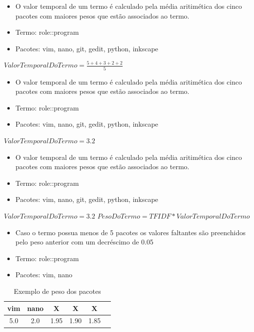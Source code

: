 \begin{frame}
    \begin{itemize}
        \item O valor temporal de um termo é calculado pela média aritimética dos cinco
pacotes com maiores pesos que estão associados
ao termo.
        \item Termo: role::program
        \item Pacotes: vim, nano, git, gedit, python, inkscape
    \end{itemize}

    $ValorTemporalDoTermo = \frac{5 + 4 + 3 + 2 + 2}{5}$
\end{frame}

\begin{frame}
    \begin{itemize}
        \item O valor temporal de um termo é calculado pela média aritimética dos cinco
pacotes com maiores pesos que estão associados
ao termo.
        \item Termo: role::program
        \item Pacotes: vim, nano, git, gedit, python, inkscape
    \end{itemize}

    $ValorTemporalDoTermo = 3.2$
\end{frame}

\begin{frame}
    \begin{itemize}
        \item O valor temporal de um termo é calculado pela média aritimética dos cinco
pacotes com maiores pesos que estão associados
ao termo.
        \item Termo: role::program
        \item Pacotes: vim, nano, git, gedit, python, inkscape
    \end{itemize}

    $ValorTemporalDoTermo = 3.2$
    $PesoDoTermo = TFIDF * ValorTemporalDoTermo$
\end{frame}

\begin{frame}
    \begin{itemize}
        \item Caso o termo possua menos de 5 pacotes os valores faltantes são
    preenchidos pelo peso anterior com um decréscimo de 0.05
        \item Termo: role::program
        \item Pacotes: vim, nano
    \end{itemize}

    \begin{table}[h]
    \centering
    \begin{tabular}{cccccc}
    \hline
    \rowcolor[HTML]{EFEFEF}
    {vim} & {nano} & {X} & {X} & {X} \\ \hline
    {5.0} & {2.0} & {1.95} & {1.90} & {1.85} \\ \hline
    \end{tabular}
    \caption{Exemplo de peso dos pacotes}
    \label{tab:classificacao_pacotes}
    \end{table}
\end{frame}

